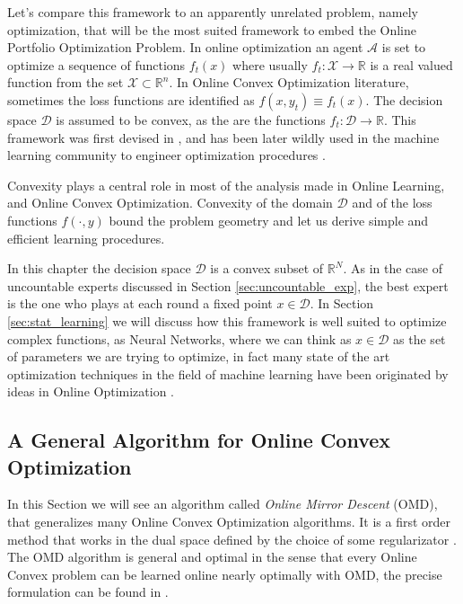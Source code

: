 Let's compare this framework to an apparently unrelated problem, namely optimization, that will be the most suited framework to embed the Online Portfolio Optimization Problem. In online optimization an agent $\mathcal A$ is set to optimize a sequence of functions $f_t(x)$ where usually $f_t:\mathcal X\to \mathbb R$ is a real valued function from the set $\mathcal X\subset\mathbb R^n$. In Online Convex Optimization literature, sometimes the loss functions are identified as $f(x,y_t)\equiv f_t(x)$.
The decision space $\mathcal D$ is assumed to be convex, as the are the functions $f_t:\mathcal D\to \mathbb R$. This framework was first devised in \cite{zinkevich2003online}, and has been later wildly used in the machine learning community to engineer optimization procedures \cite{shalev2012online}. 

Convexity plays a central role in most of the analysis made in Online Learning, and Online Convex Optimization. Convexity of the domain $\mathcal D$ and of the loss functions $f(\cdot,y)$ bound the problem geometry and let us derive simple and efficient learning procedures.

In this chapter the decision space $\mathcal D$ is a convex subset of $\mathbb R^N$. As in the case of uncountable experts discussed in Section \ref{sec:uncountable_exp}, the best expert is the one who plays at each round a fixed point $x\in\mathcal D$. In Section \ref{sec:stat_learning} we will discuss how this framework is well suited to optimize complex functions, as Neural Networks, where we can think as $x\in\mathcal D$ as the set of parameters we are trying to optimize, in fact many state of the art optimization techniques in the field of machine learning have been originated by ideas in Online Optimization \cite{duchi2011adaptive}.

\subsection{A General Algorithm for Online Convex Optimization}\label{sec:OMD}

In this Section we will see an algorithm called \emph{Online Mirror Descent} (OMD), that generalizes many Online Convex Optimization algorithms. It is a first order method that works in the dual space defined by the choice of some regularizator . The OMD algorithm is general and optimal in the sense that every Online Convex problem can be learned online nearly optimally with OMD, the precise formulation can be found in \cite{srebro2011universality}.

